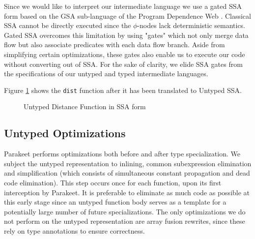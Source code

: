 \documentclass[10pt,twocolumn]{article}
\begin{document}
Since we would like to interpret our intermediate language we use a gated SSA form based on the GSA sub-language of the Program Dependence Web \cite{Ott90}. Classical SSA cannot be directly executed since the $\phi$-nodes lack deterministic semantics. Gated SSA overcomes this limitation by using "gates" which not only merge data flow but also associate predicates with each data flow branch. Aside from simplifying certain optimizations, these gates also enable us to execute our code without converting out of SSA.  For the sake of clarity, we elide SSA gates from the specifications of our untyped and typed intermediate languages. 

Figure \ref{UntypedSSADist} shows the \texttt{dist} function after it has been translated to Untyped SSA.

\begin{figure}[h!]
\caption{Untyped Distance Function in SSA form}
\label{UntypedSSADist}
\end{figure}

\subsection{Untyped Optimizations}
Parakeet performs optimizations both before and after type specialization. We subject the untyped representation to inlining, common subexpression elimination and simplification (which consists of simultaneous constant propagation and dead code elimination). This step occurs once for each function, upon its first interception by Parakeet. It is preferable to eliminate as much code as possible at this early stage since an untyped function body serves as a template for a potentially large number of future specializations. The only optimizations we do not perform on the untyped representation are array fusion rewrites, since these rely on type annotations to ensure correctness.
\end{document}
